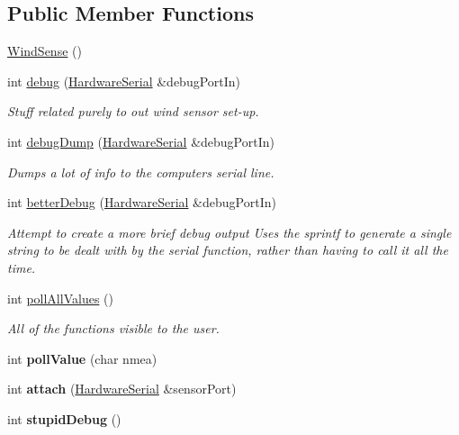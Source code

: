 \subsection*{\-Public \-Member \-Functions}
\begin{DoxyCompactItemize}
\item 
\hyperlink{classWindSense_af664d8ea5db527206e64301455277929}{\-Wind\-Sense} ()
\item 
int \hyperlink{classWindSense_a41186075f501fbc3b9c691e215c4ec47}{debug} (\hyperlink{classHardwareSerial}{\-Hardware\-Serial} \&debug\-Port\-In)
\begin{DoxyCompactList}\small\item\em \-Stuff related purely to out wind sensor set-\/up. \end{DoxyCompactList}\item 
int \hyperlink{classWindSense_aa68e74aa80256710f68238196f4d5fd0}{debug\-Dump} (\hyperlink{classHardwareSerial}{\-Hardware\-Serial} \&debug\-Port\-In)
\begin{DoxyCompactList}\small\item\em \-Dumps a lot of info to the computers serial line. \end{DoxyCompactList}\item 
\hypertarget{classWindSense_ab7f27184b3f70ddabb19ebc299b7e79e}{
int \hyperlink{classWindSense_ab7f27184b3f70ddabb19ebc299b7e79e}{better\-Debug} (\hyperlink{classHardwareSerial}{\-Hardware\-Serial} \&debug\-Port\-In)}
\label{classWindSense_ab7f27184b3f70ddabb19ebc299b7e79e}

\begin{DoxyCompactList}\small\item\em \-Attempt to create a more brief debug output \-Uses the sprintf to generate a single string to be dealt with by the serial function, rather than having to call it all the time. \end{DoxyCompactList}\item 
int \hyperlink{classWindSense_aa85692bc66f9f6d635e81590a0782a45}{poll\-All\-Values} ()
\begin{DoxyCompactList}\small\item\em \-All of the functions visible to the user. \end{DoxyCompactList}\item 
\hypertarget{classWindSense_a622dd679c41dd169ff9ed4286c170fff}{
int {\bfseries poll\-Value} (char nmea)}
\label{classWindSense_a622dd679c41dd169ff9ed4286c170fff}

\item 
\hypertarget{classWindSense_aa65c5726c560c19369894c401e82c280}{
int {\bfseries attach} (\hyperlink{classHardwareSerial}{\-Hardware\-Serial} \&sensor\-Port)}
\label{classWindSense_aa65c5726c560c19369894c401e82c280}

\item 
\hypertarget{classWindSense_a4eb80a839c1856caac3f8303bb7362e6}{
int {\bfseries stupid\-Debug} ()}
\label{classWindSense_a4eb80a839c1856caac3f8303bb7362e6}

\end{DoxyCompactItemize}


